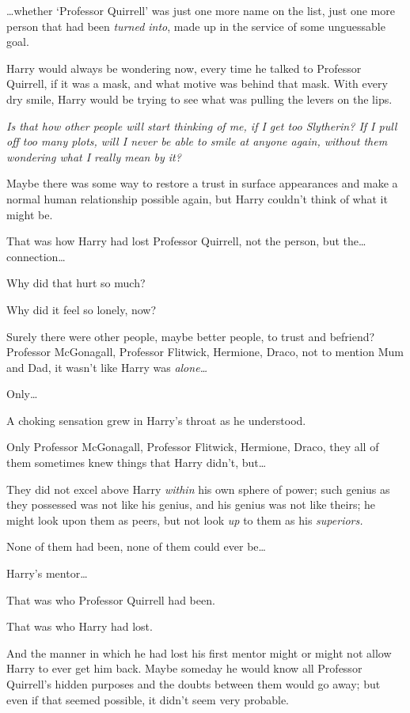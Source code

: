 \ldots{}whether `Professor Quirrell' was just one more name on the list,
just one more person that had been \emph{turned into}, made up in the
service of some unguessable goal.

Harry would always be wondering now, every time he talked to Professor
Quirrell, if it was a mask, and what motive was behind that mask. With
every dry smile, Harry would be trying to see what was pulling the
levers on the lips.

\emph{Is that how other people will start thinking of me, if I get too
Slytherin? If I pull off too many plots, will I never be able to smile
at anyone again, without them wondering what I really mean by it?}

Maybe there was some way to restore a trust in surface appearances and
make a normal human relationship possible again, but Harry couldn't
think of what it might be.

That was how Harry had lost Professor Quirrell, not the person, but
the\ldots{} connection\ldots{}

Why did that hurt so much?

Why did it feel so lonely, now?

Surely there were other people, maybe better people, to trust and
befriend? Professor McGonagall, Professor Flitwick, Hermione, Draco, not
to mention Mum and Dad, it wasn't like Harry was \emph{alone\ldots{}}

Only\ldots{}

A choking sensation grew in Harry's throat as he understood.

Only Professor McGonagall, Professor Flitwick, Hermione, Draco, they all
of them sometimes knew things that Harry didn't, but\ldots{}

They did not excel above Harry \emph{within} his own sphere of power;
such genius as they possessed was not like his genius, and his genius
was not like theirs; he might look upon them as peers, but not look
\emph{up} to them as his \emph{superiors.}

None of them had been, none of them could ever be\ldots{}

Harry's mentor\ldots{}

That was who Professor Quirrell had been.

That was who Harry had lost.

And the manner in which he had lost his first mentor might or might not
allow Harry to ever get him back. Maybe someday he would know all
Professor Quirrell's hidden purposes and the doubts between them would
go away; but even if that seemed possible, it didn't seem very probable.

